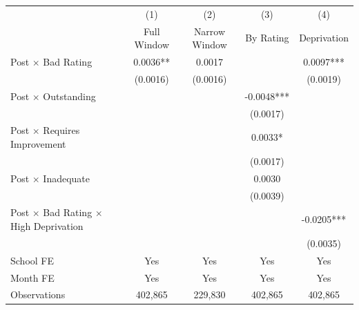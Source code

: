 \begin{tabular}{lcccc}
\toprule
 & (1) & (2) & (3) & (4) \\
 & Full Window & Narrow Window & By Rating & Deprivation \\
\midrule
Post $\times$ Bad Rating & 0.0036** & 0.0017 & & 0.0097*** \\
 & (0.0016) & (0.0016) & & (0.0019) \\
Post $\times$ Outstanding & & & -0.0048*** & \\
 & & & (0.0017) & \\
Post $\times$ Requires Improvement & & & 0.0033* & \\
 & & & (0.0017) & \\
Post $\times$ Inadequate & & & 0.0030 & \\
 & & & (0.0039) & \\
Post $\times$ Bad Rating $\times$ High Deprivation & & & & -0.0205*** \\
 & & & & (0.0035) \\
\midrule
School FE & Yes & Yes & Yes & Yes \\
Month FE & Yes & Yes & Yes & Yes \\
Observations & 402,865 & 229,830 & 402,865 & 402,865 \\
\bottomrule
\end{tabular}
